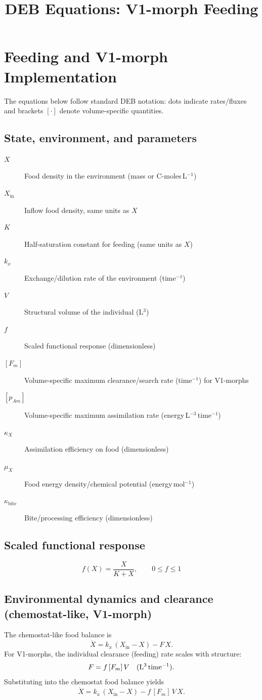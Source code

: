 \documentclass[11pt]{article}
\title{DEB Equations: V1-morph Feeding}
\author{}
\date{}
\begin{document}
\maketitle
\section{Feeding and V1-morph Implementation}

The equations below follow standard DEB notation: dots indicate rates/fluxes and brackets \([\cdot]\) denote volume-specific quantities.

\subsection{State, environment, and parameters}
\begin{description}
	\item[\(X\)] Food density in the environment (mass or C-moles\,L\(^{-1}\))
	\item[\(X_{\mathrm{in}}\)] Inflow food density, same units as \(X\)
	\item[\(K\)] Half-saturation constant for feeding (same units as \(X\))
	\item[\(k_x\)] Exchange/dilution rate of the environment (time\(^{-1}\))
	\item[\(V\)] Structural volume of the individual (L\(^3\))
	\item[\(f\)] Scaled functional response (dimensionless)
	\item[{\([F_m]\)}] Volume-specific maximum clearance/search rate (time\(^{-1}\)) for V1-morphs
	\item[{\([p_{Am}]\)}] Volume-specific maximum assimilation rate (energy\,L\(^{-3}\)\,time\(^{-1}\))
	\item[\(\kappa_X\)] Assimilation efficiency on food (dimensionless)
	\item[\(\mu_X\)] Food energy density/chemical potential (energy\,mol\(^{-1}\))
	\item[\(\kappa_{\mathrm{bite}}\)] Bite/processing efficiency (dimensionless)
\end{description}

\subsection{Scaled functional response}
\[
	f(X) = \frac{X}{K + X}, \qquad 0 \le f \le 1
\]

\subsection{Environmental dynamics and clearance (chemostat-like, V1-morph)}
The chemostat-like food balance is
\[
	\dot{X} = k_x\,(X_{\mathrm{in}} - X) - F\,X .
\]
For V1-morphs, the individual clearance (feeding) rate scales with structure:
\[
	F = f\,[F_m]\,V \quad \text{(L\(^3\)\,time\(^{-1}\))}.
\]
Substituting into the chemostat food balance yields
\[
	\dot{X} = k_x\,(X_{\mathrm{in}} - X) - f\,[F_m]\,V\,X .
\]
\end{document}
